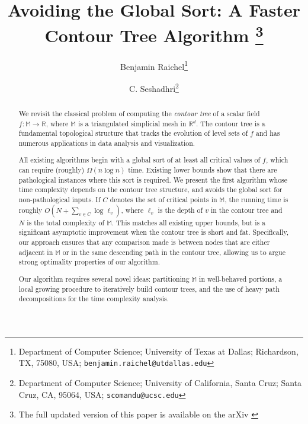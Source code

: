 \documentclass[11pt]{article}
\theoremstyle{definition}
\newcommand{\MM}{\mathbb{M}}
\newcommand{\RR}{\mathbb{R}}
\newcommand{\si}[1]{#1}
\begin{document}
\author{
  Benjamin Raichel\thanks{%
      Department of Computer Science; %
      University of Texas at Dallas; %
      Richardson, TX, 75080, USA; %
      \texttt{\si{benjamin.raichel}@\si{utdallas}.\si{edu}} %
  }
  \and
  C. Seshadhri\thanks{%
        Department of Computer Science; %
      University of California, Santa Cruz; %
      Santa Cruz, CA, 95064, USA; %
      \texttt{\si{scomandu}@\si{ucsc}.\si{edu}} %
  }
}

\title{%
Avoiding the Global Sort: 
\break A Faster Contour Tree Algorithm%
\footnote{The full updated version of this paper is available on the arXiv \cite{rs-mvrms-14}}%
}
\date{}

\maketitle
\thispagestyle{empty}


\begin{abstract}
We revisit the classical problem of computing the \emph{contour tree}
of a scalar field $f:\MM \to \RR$, where $\MM$ is a triangulated simplicial mesh in $\RR^d$. 
The contour tree is a fundamental topological structure that tracks
the evolution of level sets of $f$ and 
has numerous applications in data analysis and visualization.

All existing algorithms begin with a global sort of at least all critical values of $f$,
which can require (roughly) $\Omega(n\log n)$ time.
Existing lower bounds show that there are pathological instances where this sort is required.
We present the first algorithm whose time complexity depends
on the contour tree structure, and avoids the global sort for non-pathological inputs.
If $C$ denotes the set of critical points in $\MM$, the running time is
roughly $O(N+\sum_{v \in C} \log \ell_v)$, where $\ell_v$ is the depth of $v$ in the contour tree and $N$ is the total complexity of $\MM$.
This matches all existing upper bounds, but is a significant asymptotic improvement when the contour tree is short and fat.
Specifically, our approach ensures that any comparison made is between nodes that are either adjacent in $\MM$ 
or in the same descending path in the contour tree,
allowing us to argue strong optimality properties of our algorithm.

Our algorithm requires several novel ideas: partitioning $\MM$ in well-behaved portions, 
a local growing procedure to iteratively build contour trees, and the use of heavy path 
decompositions for the time complexity analysis. 
\end{abstract}
\end{document}
